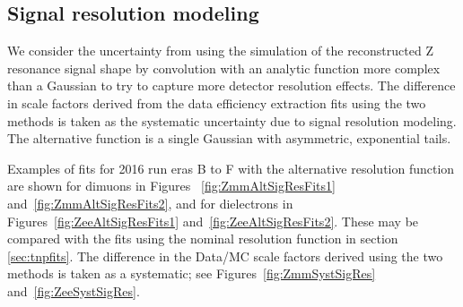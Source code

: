 {\clearpage
\subsection{Signal resolution modeling}
We consider the uncertainty from using the simulation of the reconstructed Z resonance signal shape
by convolution with an analytic function more complex than a Gaussian to try to capture more detector resolution effects.
The difference in scale factors derived from the data efficiency extraction fits using the two methods
is taken as the systematic uncertainty due to signal resolution modeling.
The alternative function is a single Gaussian with asymmetric, exponential tails.

Examples of fits for 2016 run eras B to F with the alternative resolution function are shown for dimuons in
Figures ~\ref{fig:ZmmAltSigResFits1} and~\ref{fig:ZmmAltSigResFits2}, 
and for dielectrons in Figures~\ref{fig:ZeeAltSigResFits1} and~\ref{fig:ZeeAltSigResFits2}.
These may be compared with the fits using the nominal resolution function
in section \ref{sec:tnpfits}.
The difference in the Data/MC scale factors derived using the two methods is taken as a systematic; 
see Figures~\ref{fig:ZmmSystSigRes} and~\ref{fig:ZeeSystSigRes}.

}
